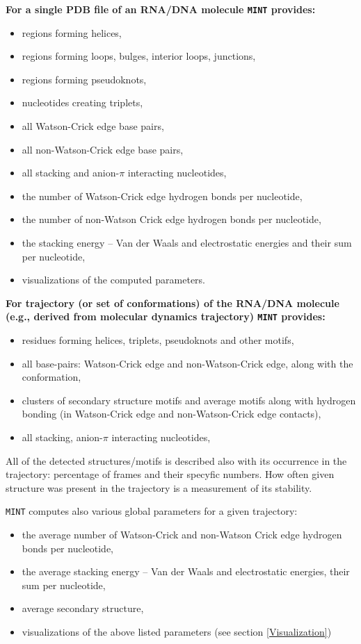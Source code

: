 \documentclass[12pt]{article}
\begin{document}
\textbf{For a single PDB file of an RNA/DNA molecule {\tt MINT} provides:}
\begin{itemize}
\item regions forming helices,
\item regions forming loops, bulges, interior loops, junctions,
\item regions forming pseudoknots,
\item nucleotides creating triplets,
\item all Watson-Crick edge base pairs,
\item all non-Watson-Crick edge base pairs,
\item all stacking and anion-$\pi$ interacting nucleotides,
\item the number of Watson-Crick edge hydrogen bonds per nucleotide,
\item the number of non-Watson Crick edge hydrogen bonds per nucleotide,
\item the stacking energy -- Van der Waals and electrostatic energies and their sum per nucleotide,
\item visualizations of the computed parameters.
\end{itemize}

\noindent
\textbf{For trajectory (or set of conformations) of the RNA/DNA molecule (e.g., derived from molecular dynamics trajectory) {\tt MINT} provides:}
\begin{itemize}
\item residues forming helices, triplets, pseudoknots and other motifs, 
\item all base-pairs: Watson-Crick edge and non-Watson-Crick edge, along with the conformation,
\item clusters of secondary structure motifs and average motifs along with hydrogen bonding (in Watson-Crick edge and non-Watson-Crick edge contacts),
\item all stacking, anion-$\pi$ interacting nucleotides, 
\end{itemize}
All of the detected structures/motifs is described also with its occurrence in the trajectory: percentage of frames and their specyfic numbers. How often given structure was present in the trajectory is a measurement of its stability.

{\tt MINT} computes also various global parameters for a given trajectory:
\begin{itemize}
\item the average number of Watson-Crick and non-Watson Crick edge hydrogen bonds per nucleotide,
\item the average stacking energy -- Van der Waals and electrostatic energies, their sum per nucleotide,
\item average secondary structure,
\item visualizations of the above listed parameters (see section \ref{Visualization})
\end{itemize}
\end{document}

